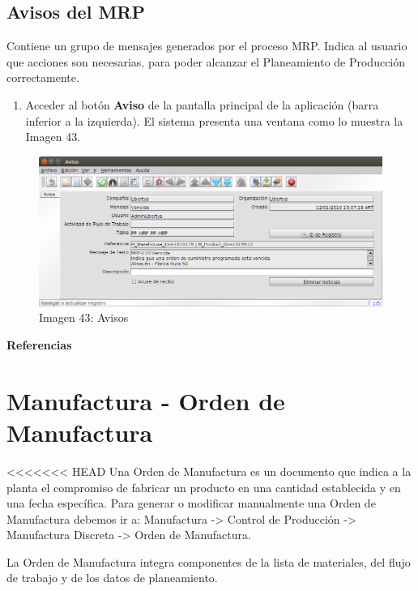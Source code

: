 \documentclass[letterpaper,10pt,spanish]{sphinxmanual}
\begin{document}
\subsection{Avisos del MRP}
\label{manufactura-proceso:avisos-del-mrp}
Contiene un grupo de mensajes generados por el proceso MRP. Indica al usuario que acciones son necesarias, para poder alcanzar el Planeamiento de Producción correctamente.
\begin{enumerate}
\item {} 
Acceder al botón \textbf{Aviso} de la pantalla principal de la aplicación (barra inferior a la izquierda). El sistema presenta una ventana como lo muestra la Imagen 43.

\end{enumerate}
\begin{figure}[htbp]
\centering
\capstart

\includegraphics{ly_avisos.png}
\caption{Imagen 43: Avisos}\end{figure}

\textbf{Referencias}


\section{Manufactura - Orden de Manufactura}
\label{manufactura-om:manufactura-orden-de-manufactura}\label{manufactura-om::doc}
\textless{}\textless{}\textless{}\textless{}\textless{}\textless{}\textless{} HEAD
Una Orden de Manufactura es un documento que indica a la planta el compromiso de
fabricar un producto en una cantidad establecida y en una fecha específica.
Para  generar  o  modificar  manualmente  una  Orden  de  Manufactura  debemos ir a:
Manufactura -\textgreater{} Control de Producción -\textgreater{} Manufactura Discreta -\textgreater{} Orden de Manufactura.

La Orden de Manufactura integra componentes de la lista de materiales, del flujo de
trabajo y de los datos de planeamiento.
\end{document}
